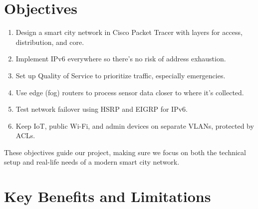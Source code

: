 \documentclass[12pt,a4paper]{article}
\begin{document}
\vspace{1em}

\section*{Objectives}
\begin{enumerate}[label=3.\arabic*, nosep]
    \item Design a smart city network in Cisco Packet Tracer with layers for access, distribution, and core.
    \item Implement IPv6 everywhere so there’s no risk of address exhaustion.
    \item Set up Quality of Service to prioritize traffic, especially emergencies.
    \item Use edge (fog) routers to process sensor data closer to where it’s collected.
    \item Test network failover using HSRP and EIGRP for IPv6.
    \item Keep IoT, public Wi-Fi, and admin devices on separate VLANs, protected by ACLs.
\end{enumerate}
These objectives guide our project, making sure we focus on both the technical setup and real-life needs of a modern smart city network.

\newpage

\section*{Key Benefits and Limitations}
\end{document}
